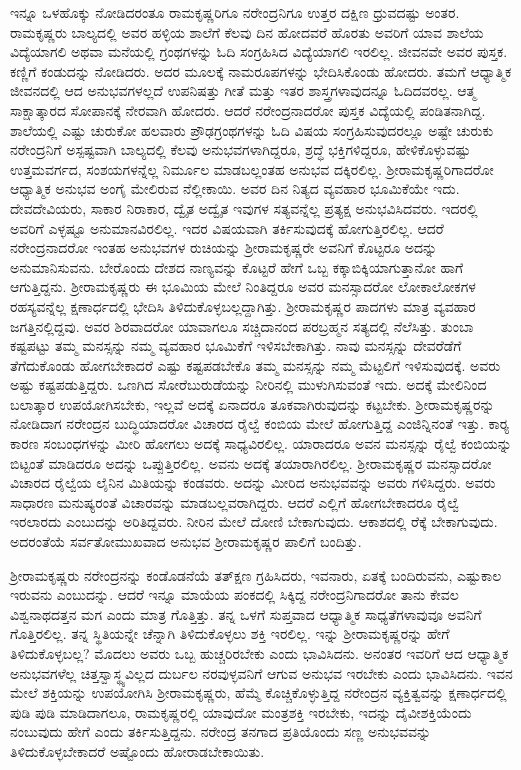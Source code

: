 ಇನ್ನೂ ಒಳಹೊಕ್ಕು ನೋಡಿದರಂತೂ ರಾಮಕೃಷ್ಣರಿಗೂ ನರೇಂದ್ರನಿಗೂ ಉತ್ತರ ದಕ್ಷಿಣ ಧ್ರುವದಷ್ಟು ಅಂತರ. ರಾಮಕೃಷ್ಣರು ಬಾಲ್ಯದಲ್ಲಿ ಅವರ ಹಳ್ಳಿಯ ಶಾಲೆಗೆ ಕೆಲವು ದಿನ ಹೋದವರೆ ಹೊರತು ಅವರಿಗೆ ಯಾವ ಶಾಲೆಯ ವಿದ್ಯೆಯಾಗಲಿ ಅಥವಾ ಮನೆಯಲ್ಲಿ ಗ್ರಂಥಗಳನ್ನು ಓದಿ ಸಂಗ್ರಹಿಸಿದ ವಿದ್ಯೆಯಾಗಲಿ ಇರಲಿಲ್ಲ. ಜೀವನವೇ ಅವರ ಪುಸ್ತಕ. ಕಣ್ಣಿಗೆ ಕಂಡುದನ್ನು ನೋಡಿದರು. ಅದರ ಮೂಲಕ್ಕೆ ನಾಮರೂಪಗಳನ್ನು ಭೇದಿಸಿಕೊಂಡು ಹೋದರು. ತಮಗೆ ಆಧ್ಯಾತ್ಮಿಕ ಜೀವನದಲ್ಲಿ ಆದ ಅನುಭವಗಳಲ್ಲದೆ ಉಪನಿಷತ್ತು ಗೀತೆ ಮತ್ತು ಇತರ ಶಾಸ್ತ್ರಗಳಾವುದನ್ನೂ ಓದಿದವರಲ್ಲ. ಆತ್ಮ ಸಾಕ್ಷಾತ್ಕಾರದ ಸೋಪಾನಕ್ಕೆ ನೇರವಾಗಿ ಹೋದರು. ಆದರೆ ನರೇಂದ್ರನಾದರೋ ಪುಸ್ತಕ ವಿದ್ಯೆಯಲ್ಲಿ ಪಂಡಿತನಾಗಿದ್ದ. ಶಾಲೆಯಲ್ಲಿ ಎಷ್ಟು ಚುರುಕೋ ಹಲವಾರು ಪ್ರೌಢಗ್ರಂಥಗಳನ್ನು ಓದಿ ವಿಷಯ ಸಂಗ್ರಹಿಸುವುದರಲ್ಲೂ ಅಷ್ಟೇ ಚುರುಕು ನರೇಂದ್ರನಿಗೆ ಅಸ್ಪಷ್ಟವಾಗಿ ಬಾಲ್ಯದಲ್ಲಿ ಕೆಲವು ಅನುಭವಗಳಾಗಿದ್ದರೂ, ಶ್ರದ್ಧೆ ಭಕ್ತಿಗಳಿದ್ದರೂ, ಹೇಳಿಕೊಳ್ಳುವಷ್ಟು ಉತ್ತಮವರ್ಗದ, ಸಂಶಯಗಳನ್ನೆಲ್ಲ ನಿರ್ಮೂಲ ಮಾಡಬಲ್ಲಂತಹ ಅನುಭವ ದಕ್ಕಿರಲಿಲ್ಲ. ಶ‍್ರೀರಾಮಕೃಷ್ಣರಿಗಾದರೋ ಆಧ್ಯಾತ್ಮಿಕ ಅನುಭವ ಅಂಗೈ ಮೇಲಿರುವ ನೆಲ್ಲೀಕಾಯಿ. ಅವರ ದಿನ ನಿತ್ಯದ ವ್ಯವಹಾರ ಭೂಮಿಕೆಯೇ ಇದು. ದೇವದೇವಿಯರು, ಸಾಕಾರ ನಿರಾಕಾರ, ದ್ವೈತ ಅದ್ವೈತ ಇವುಗಳ ಸತ್ಯವನ್ನೆಲ್ಲ ಪ್ರತ್ಯಕ್ಷ ಅನುಭವಿಸಿದವರು. ಇದರಲ್ಲಿ ಅವರಿಗೆ ಎಳ್ಳಷ್ಟೂ ಅನುಮಾನವಿರಲಿಲ್ಲ. ಇದರ ವಿಷಯವಾಗಿ ತರ್ಕಿಸುವುದಕ್ಕೆ ಹೋಗುತ್ತಿರಲಿಲ್ಲ. ಆದರೆ ನರೇಂದ್ರನಾದರೋ ಇಂತಹ ಅನುಭವಗಳ ರುಚಿಯನ್ನು ಶ‍್ರೀರಾಮಕೃಷ್ಣರೇ ಅವನಿಗೆ ಕೊಟ್ಟರೂ ಅದನ್ನು ಅನುಮಾನಿಸುವನು. ಬೇರೊಂದು ದೇಶದ ನಾಣ್ಯವನ್ನು ಕೊಟ್ಟರೆ ಹೇಗೆ ಒಬ್ಬ ಕಕ್ಕಾಬಿಕ್ಕಿಯಾಗುತ್ತಾನೋ ಹಾಗೆ ಆಗುತ್ತಿದ್ದನು. ಶ‍್ರೀರಾಮಕೃಷ್ಣರು ಈ ಭೂಮಿಯ ಮೇಲೆ ನಿಂತಿದ್ದರೂ ಅವರ ಮನಸ್ಸಾದರೋ ಲೋಕಾಲೋಕಗಳ ರಹಸ್ಯವನ್ನೆಲ್ಲ ಕ್ಷಣಾರ್ಧದಲ್ಲಿ ಭೇದಿಸಿ ತಿಳಿದುಕೊಳ್ಳಬಲ್ಲದ್ದಾಗಿತ್ತು. ಶ‍್ರೀರಾಮಕೃಷ್ಣರ ಪಾದಗಳು ಮಾತ್ರ ವ್ಯವಹಾರ ಜಗತ್ತಿನಲ್ಲಿದ್ದವು. ಅವರ ಶಿರವಾದರೋ ಯಾವಾಗಲೂ ಸಚ್ಚಿದಾನಂದ ಪರಬ್ರಹ್ಮನ ಸತ್ಯದಲ್ಲಿ ನೆಲೆಸಿತ್ತು. ತುಂಬಾ ಕಷ್ಟಪಟ್ಟು ತಮ್ಮ ಮನಸ್ಸನ್ನು ನಮ್ಮ ವ್ಯವಹಾರ ಭೂಮಿಕೆಗೆ ಇಳಿಸಬೇಕಾಗಿತ್ತು. ನಾವು ಮನಸ್ಸನ್ನು ದೇವರೆಡೆಗೆ ತೆಗೆದುಕೊಂಡು ಹೋಗಬೇಕಾದರೆ ಎಷ್ಟು ಕಷ್ಟಪಡಬೇಕೊ ತಮ್ಮ ಮನಸ್ಸನ್ನು ನಮ್ಮ ಮೆಟ್ಟಲಿಗೆ ಇಳಿಸುವುದಕ್ಕೆ. ಅವರು ಅಷ್ಟು ಕಷ್ಟಪಡುತ್ತಿದ್ದರು. ಒಣಗಿದ ಸೋರೆಬುರುಡೆಯನ್ನು ನೀರಿನಲ್ಲಿ ಮುಳುಗಿಸುವಂತೆ ಇದು. ಅದಕ್ಕೆ ಮೇಲಿನಿಂದ ಬಲಾತ್ಕಾರ ಉಪಯೋಗಿಸಬೇಕು, ಇಲ್ಲವೆ ಅದಕ್ಕೆ ಏನಾದರೂ ತೂಕವಾಗಿರುವುದನ್ನು ಕಟ್ಟಬೇಕು. ಶ‍್ರೀರಾಮಕೃಷ್ಣರನ್ನು ನೋಡಿದಾಗ ನರೇಂದ್ರನ ಬುದ್ಧಿಯಾದರೋ ವಿಚಾರದ ರೈಲ್ವೆ ಕಂಬಿಯ ಮೇಲೆ ಹೋಗುತ್ತಿದ್ದ ಎಂಜಿನ್ನಿನಂತೆ ಇತ್ತು. ಕಾರ‍್ಯ ಕಾರಣ ಸಂಬಂಧಗಳನ್ನು ಮೀರಿ ಹೋಗಲು ಅದಕ್ಕೆ ಸಾಧ್ಯವಿರಲಿಲ್ಲ. ಯಾರಾದರೂ ಅವನ ಮನಸ್ಸನ್ನು ರೈಲ್ವೆ ಕಂಬಿಯನ್ನು ಬಿಟ್ಟಂತೆ ಮಾಡಿದರೂ ಅದನ್ನು ಒಪ್ಪುತ್ತಿರಲಿಲ್ಲ. ಅವನು ಅದಕ್ಕೆ ತಯಾರಾಗಿರಲಿಲ್ಲ. ಶ‍್ರೀರಾಮಕೃಷ್ಣರ ಮನಸ್ಸಾದರೋ ವಿಚಾರದ ರೈಲ್ವೆಯ ಲೈನಿನ ಮಿತಿಯನ್ನು ಕಂಡವರು. ಅದನ್ನು ಮೀರಿದ ಅನುಭವವನ್ನು ಅವರು ಗಳಿಸಿದ್ದರು. ಅವರು ಸಾಧಾರಣ ಮನುಷ್ಯರಂತೆ ವಿಚಾರವನ್ನು ಮಾಡಬಲ್ಲವರಾಗಿದ್ದರು. ಆದರೆ ಎಲ್ಲಿಗೆ ಹೋಗಬೇಕಾದರೂ ರೈಲ್ವೆ ಇರಲಾರದು ಎಂಬುದನ್ನು ಅರಿತಿದ್ದವರು. ನೀರಿನ ಮೇಲೆ ದೋಣಿ ಬೇಕಾಗುವುದು. ಆಕಾಶದಲ್ಲಿ ರೆಕ್ಕೆ ಬೇಕಾಗುವುದು. ಅದರಂತೆಯೆ ಸರ್ವತೋಮುಖವಾದ ಅನುಭವ ಶ‍್ರೀರಾಮಕೃಷ್ಣರ ಪಾಲಿಗೆ ಬಂದಿತ್ತು.

ಶ‍್ರೀರಾಮಕೃಷ್ಣರು ನರೇಂದ್ರನನ್ನು ಕಂಡೊಡನೆಯೆ ತತ್‍ಕ್ಷಣ ಗ್ರಹಿಸಿದರು, ಇವನಾರು, ಏತಕ್ಕೆ ಬಂದಿರುವನು, ಎಷ್ಟುಕಾಲ ಇರುವನು ಎಂಬುದನ್ನು. ಆದರೆ ಇನ್ನೂ ಮಾಯೆಯ ಪಂಕದಲ್ಲಿ ಸಿಕ್ಕಿದ್ದ ನರೇಂದ್ರನಿಗಾದರೋ ತಾನು ಕೇವಲ ವಿಶ್ವನಾಥದತ್ತನ ಮಗ ಎಂದು ಮಾತ್ರ ಗೊತ್ತಿತ್ತು. ತನ್ನ ಒಳಗೆ ಸುಪ್ತವಾದ ಆಧ್ಯಾತ್ಮಿಕ ಸಾಧ್ಯತೆಗಳಾವುವೂ ಅವನಿಗೆ ಗೊತ್ತಿರಲಿಲ್ಲ. ತನ್ನ ಸ್ಥಿತಿಯನ್ನೇ ಚೆನ್ನಾಗಿ ತಿಳಿದುಕೊಳ್ಳಲು ಶಕ್ತಿ ಇರಲಿಲ್ಲ. ಇನ್ನು ಶ‍್ರೀರಾಮಕೃಷ್ಣರನ್ನು ಹೇಗೆ ತಿಳಿದುಕೊಳ್ಳಬಲ್ಲ? ಮೊದಲು ಅವರು ಒಬ್ಬ ಹುಚ್ಚರಿರಬೇಕು ಎಂದು ಭಾವಿಸಿದನು. ಅನಂತರ ಇವರಿಗೆ ಆದ ಆಧ್ಯಾತ್ಮಿಕ ಅನುಭವಗಳೆಲ್ಲ ಚಿತ್ತಸ್ವಾಸ್ಥ್ಯವಿಲ್ಲದ ದುರ್ಬಲ ನರವುಳ್ಳವನಿಗೆ ಆಗುವ ಅನುಭವ ಇರಬೇಕು ಎಂದು ಭಾವಿಸಿದನು. ಇವನ ಮೇಲೆ ಶಕ್ತಿಯನ್ನು ಉಪಯೋಗಿಸಿ ಶ‍್ರೀರಾಮಕೃಷ್ಣರು, ಹೆಮ್ಮೆ ಕೊಚ್ಚಿಕೊಳ್ಳುತ್ತಿದ್ದ ನರೇಂದ್ರನ ವ್ಯಕ್ತಿತ್ವವನ್ನು ಕ್ಷಣಾರ್ಧದಲ್ಲಿ ಪುಡಿ ಪುಡಿ ಮಾಡಿದಾಗಲೂ, ರಾಮಕೃಷ್ಣರಲ್ಲಿ ಯಾವುದೋ ಮಂತ್ರಶಕ್ತಿ ಇರಬೇಕು, ಇದನ್ನು ದೈವೀಶಕ್ತಿಯೆಂದು ನಂಬುವುದು ಹೇಗೆ ಎಂದು ತರ್ಕಿಸುತ್ತಿದ್ದನು. ನರೇಂದ್ರ ತನಗಾದ ಪ್ರತಿಯೊಂದು ಸಣ್ಣ ಅನುಭವವನ್ನು ತಿಳಿದುಕೊಳ್ಳಬೇಕಾದರೆ ಅಷ್ಟೊಂದು ಹೋರಾಡಬೇಕಾಯಿತು.

